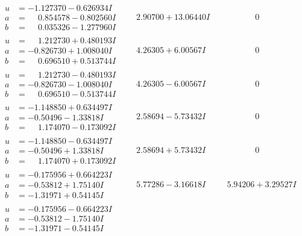 \documentclass[1p]{elsarticle_modified}
\theoremstyle{definition}
\begin{document}
$$\begin{array}{c|c|c}
\begin{aligned}
u &= -1.127370 - 0.626934 I \\
a &= \phantom{-}0.854578 - 0.802560 I \\
b &= \phantom{-}0.035326 - 1.277960 I\end{aligned}
 & \phantom{-}2.90700 + 13.06440 I & \phantom{-0.000000 } 0 \\ \hline\begin{aligned}
u &= \phantom{-}1.212730 + 0.480193 I \\
a &= -0.826730 + 1.008040 I \\
b &= \phantom{-}0.696510 + 0.513744 I\end{aligned}
 & \phantom{-}4.26305 + 6.00567 I & \phantom{-0.000000 } 0 \\ \hline\begin{aligned}
u &= \phantom{-}1.212730 - 0.480193 I \\
a &= -0.826730 - 1.008040 I \\
b &= \phantom{-}0.696510 - 0.513744 I\end{aligned}
 & \phantom{-}4.26305 - 6.00567 I & \phantom{-0.000000 } 0 \\ \hline\begin{aligned}
u &= -1.148850 + 0.634497 I \\
a &= -0.50496 - 1.33818 I \\
b &= \phantom{-}1.174070 - 0.173092 I\end{aligned}
 & \phantom{-}2.58694 - 5.73432 I & \phantom{-0.000000 } 0 \\ \hline\begin{aligned}
u &= -1.148850 - 0.634497 I \\
a &= -0.50496 + 1.33818 I \\
b &= \phantom{-}1.174070 + 0.173092 I\end{aligned}
 & \phantom{-}2.58694 + 5.73432 I & \phantom{-0.000000 } 0 \\ \hline\begin{aligned}
u &= -0.175956 + 0.664223 I \\
a &= -0.53812 + 1.75140 I \\
b &= -1.31971 + 0.54145 I\end{aligned}
 & \phantom{-}5.77286 - 3.16618 I & \phantom{-}5.94206 + 3.29527 I \\ \hline\begin{aligned}
u &= -0.175956 - 0.664223 I \\
a &= -0.53812 - 1.75140 I \\
b &= -1.31971 - 0.54145 I\end{aligned}

\end{array}$$
\end{document}
